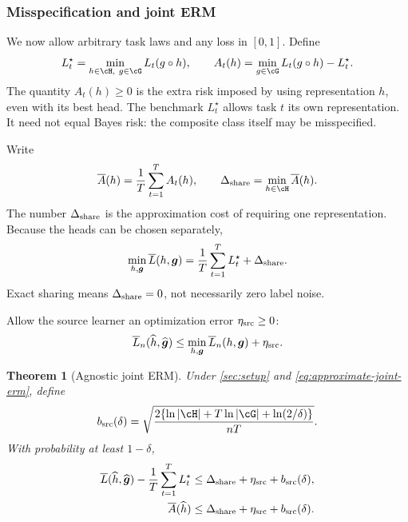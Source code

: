 \documentclass[11pt,twoside]{article}
\newtheorem{theorem}{Theorem}[section]
\theoremstyle{definition}
\theoremstyle{remark}
\begin{document}
\subsubsection{Misspecification and joint ERM}

We now allow arbitrary task laws and any loss in $[0,1]$. Define
\begin{equation}
 L_t^\star=\min_{h\in\cH,\ g\in\cG}L_t(g\circ h),
 \qquad
 A_t(h)=\min_{g\in\cG}L_t(g\circ h)-L_t^\star.
 \label{eq:representation-error}
\end{equation}
The quantity $A_t(h)\ge0$ is the extra risk imposed by using representation
$h$, even with its best head. The benchmark $L_t^\star$ allows task $t$ its
own representation. It need not equal Bayes risk: the composite class itself
may be misspecified.

Write
\begin{equation}
 \overline A(h)=\frac1T\sum_{t=1}^T A_t(h),
 \qquad
 \Delta_{\rm share}=\min_{h\in\cH}\overline A(h).
 \label{eq:sharing-cost}
\end{equation}
The number $\Delta_{\rm share}$ is the approximation cost of requiring one
representation. Because the heads can be chosen separately,
\begin{equation}
 \min_{h,\boldsymbol g}\overline L(h,\boldsymbol g)
 =\frac1T\sum_{t=1}^T L_t^\star+\Delta_{\rm share}.
 \label{eq:sharing-benchmark}
\end{equation}
Exact sharing means $\Delta_{\rm share}=0$, not necessarily zero label noise.

Allow the source learner an optimization error $\eta_{\rm src}\ge0$:
\begin{equation}
 \overline L_n(\widehat h,\widehat{\boldsymbol g})
 \le\min_{h,\boldsymbol g}\overline L_n(h,\boldsymbol g)
       +\eta_{\rm src}.
 \label{eq:approximate-joint-erm}
\end{equation}

\begin{theorem}[Agnostic joint ERM]
\label{thm:agnostic-multitask}
Under \cref{sec:setup} and \cref{eq:approximate-joint-erm}, define
\[
 b_{\rm src}(\delta)=
 \sqrt{\frac{2\{\ln|\cH|+T\ln|\cG|+\ln(2/\delta)\}}{nT}}.
\]
With probability at least $1-\delta$,
\begin{align}
 \overline L(\widehat h,\widehat{\boldsymbol g})
   -\frac1T\sum_{t=1}^T L_t^\star
 &\le \Delta_{\rm share}+\eta_{\rm src}+b_{\rm src}(\delta),
 \label{eq:agnostic-joint}\\
 \overline A(\widehat h)
 &\le \Delta_{\rm share}+\eta_{\rm src}+b_{\rm src}(\delta).
 \label{eq:source-representation-bound}
\end{align}
\end{theorem}
\end{document}
